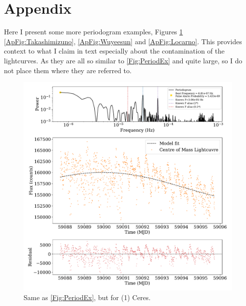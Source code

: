 \documentclass{UCreport}
\begin{document}
\section*{Appendix}
\renewcommand{\thefigure}{A.\arabic{figure}}
\setcounter{figure}{0}

Here I present some more periodogram examples, Figures \ref{ApFig:Ceres} \ref{ApFig:Takashimizuno}, \ref{ApFig:Wuyeesun} and \ref{ApFig:Locarno}.
This provides context to what I claim in text especially about the contamination of the lightcurves.
As they are all so similar to \autoref{Fig:PeriodEx} and quite large, so I do not place them where they are referred to.

\begin{figure}
  \centering
  \includegraphics[width = \textwidth]{Figures/PeriodogramCeresResid.pdf}
  \caption[(1) Ceres Periodogram]{Same as \autoref{Fig:PeriodEx}, but for (1) Ceres.}
  \label{ApFig:Ceres}
\end{figure}
\end{document}
